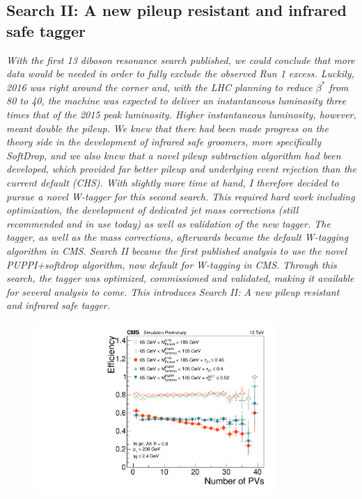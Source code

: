 \vspace*{\fill}
\begin{centering}
\section{Search II: A new pileup resistant and infrared safe tagger}
\textit{
With the first 13 \TeV diboson resonance search published, we could conclude that more data would be needed in order to fully exclude the observed Run 1 excess. Luckily, 2016 was right around the corner and, with the LHC planning to reduce $\beta^*$ from 80 \cm to 40, the machine was expected to deliver an instantaneous luminosity three times that of the 2015 peak luminosity. Higher instantaneous luminosity, however, meant double the pileup.
\newline
\newline
We knew that there had been made progress on the theory side in the development of infrared safe groomers, more specifically SoftDrop, and we also knew that a novel pileup subtraction algorithm had been developed, which provided far better pileup and underlying event rejection than the current default (CHS). With slightly more time at hand, I therefore decided to pursue a novel W-tagger for this second search. This required hard work including optimization, the development of dedicated jet mass corrections (still recommended and in use today) as well as validation of the new tagger. The tagger, as well as the mass corrections, afterwards became the default W-tagging algorithm in CMS.
\newline
\newline
Search II became the first published analysis to use the novel PUPPI+softdrop algorithm, now default for W-tagging in CMS. Through this search, the tagger was optimized, commissioned and validated, making it available for several analysis to come. This introduces Search II: A new pileup resistant and infrared safe tagger.
}
\end{centering}
\begin{figure}[b!]
    \centering
    \includegraphics[height=6.5cm]{figures/vtagging/JME-16-003/BoostedW/WtagSigEffvsNPV.pdf}
\end{figure}

